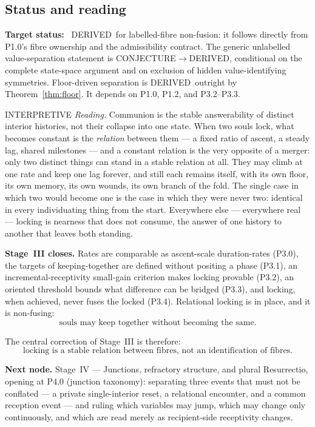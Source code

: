 \documentclass[11pt,a4paper]{article}
\newcommand{\stDerived}{\textcolor{cDer}{\textsf{\small DERIVED}}}
\newcommand{\stInterp}{\textcolor{cInt}{\textsf{\small INTERPRETIVE}}}
\newcommand{\stConj}{\textcolor{cCon}{\textsf{\small CONJECTURE}}}
\theoremstyle{definition}
\theoremstyle{plain}
\theoremstyle{remark}
\begin{document}
\subsection{Status and reading}

\textbf{Target status:}~
\stDerived\ for labelled-fibre non-fusion: it follows directly from P1.0's fibre
ownership and the admissibility contract. The generic unlabelled value-separation
statement is \stConj\(\to\)\stDerived, conditional on the complete state-space
argument and on exclusion of hidden value-identifying symmetries. Floor-driven
separation is \stDerived\ outright by Theorem~\ref{thm:floor}. It depends on P1.0,
P1.2, and P3.2--P3.3.

\medskip
\stInterp\quad
\emph{Reading.}
Communion is the stable answerability of distinct interior histories, not their collapse
into one state. When two souls lock, what becomes constant is the \emph{relation} between
them --- a fixed ratio of ascent, a steady lag, shared milestones --- and a constant relation
is the very opposite of a merger: only two distinct things can stand in a stable relation at
all. They may climb at one rate and keep one lag forever, and still each remains itself, with
its own floor, its own memory, its own wounds, its own branch of the fold. The single case in
which two would become one is the case in which they were never two: identical in every
individuating thing from the start. Everywhere else --- everywhere real --- locking is
nearness that does not consume, the answer of one history to another that leaves both
standing.

\medskip
\textbf{Stage~III closes.}
Rates are comparable as ascent-scale duration-rates (P3.0), the targets of
keeping-together are defined without positing a phase (P3.1), an
incremental-receptivity small-gain criterion makes locking provable (P3.2), an
oriented threshold bounds what difference can be bridged (P3.3), and locking, when
achieved, never fuses the locked (P3.4). Relational locking is in place, and it is
non-fusing:
\[
\boxed{
\text{souls may keep together without becoming the same.}
}
\]

The central correction of Stage~III is therefore:
\[
\boxed{
\text{locking is a stable relation between fibres, not an identification of fibres.}
}
\]

\medskip
\textbf{Next node.} Stage~IV --- Junctions, refractory structure, and plural Resurrectio,
opening at P4.0 (junction taxonomy): separating three events that must not be conflated ---
a private single-interior reset, a relational encounter, and a common reception event --- and
ruling which variables may jump, which may change only continuously, and which are read
merely as recipient-side receptivity changes.
\end{document}
